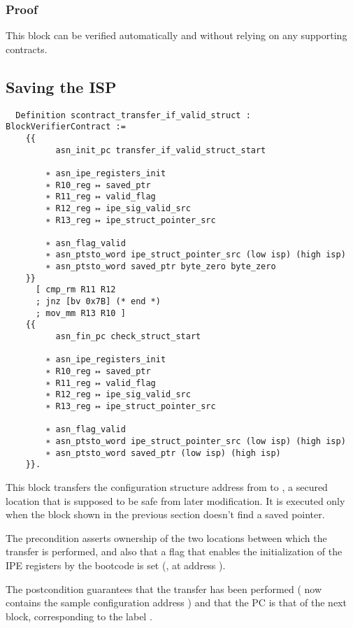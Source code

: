 \subsubsection{Proof}

This block can be verified automatically and without relying on any supporting contracts.

\subsection{Saving the ISP}

\begin{verbatim}
  Definition scontract_transfer_if_valid_struct : BlockVerifierContract :=
    {{
          asn_init_pc transfer_if_valid_struct_start

        ∗ asn_ipe_registers_init
        ∗ R10_reg ↦ saved_ptr
        ∗ R11_reg ↦ valid_flag
        ∗ R12_reg ↦ ipe_sig_valid_src
        ∗ R13_reg ↦ ipe_struct_pointer_src

        ∗ asn_flag_valid
        ∗ asn_ptsto_word ipe_struct_pointer_src (low isp) (high isp)
        ∗ asn_ptsto_word saved_ptr byte_zero byte_zero
    }}
      [ cmp_rm R11 R12
      ; jnz [bv 0x7B] (* end *)
      ; mov_mm R13 R10 ]
    {{
          asn_fin_pc check_struct_start

        ∗ asn_ipe_registers_init
        ∗ R10_reg ↦ saved_ptr
        ∗ R11_reg ↦ valid_flag
        ∗ R12_reg ↦ ipe_sig_valid_src
        ∗ R13_reg ↦ ipe_struct_pointer_src

        ∗ asn_flag_valid
        ∗ asn_ptsto_word ipe_struct_pointer_src (low isp) (high isp)
        ∗ asn_ptsto_word saved_ptr (low isp) (high isp)
    }}.
\end{verbatim}

This block transfers the configuration structure address from  to , \ie a secured location that is supposed to be safe from later modification. It is executed only when the block shown in the previous section doesn't find a saved pointer.

The precondition asserts ownership of the two locations between which the transfer is performed, and also that a flag that enables the initialization of the IPE registers by the bootcode is set (, \ie {} at address ).

The postcondition guarantees that the transfer has been performed ( now contains the sample configuration address ) and that the PC is that of the next block, corresponding to the label .

